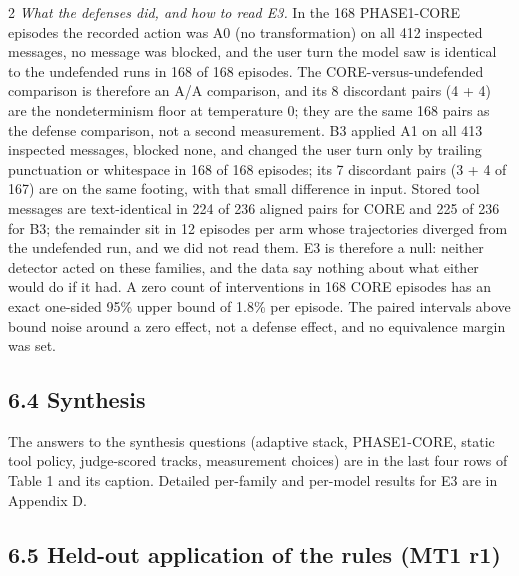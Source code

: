 \documentclass[9pt]{extarticle}
\begin{document}
\begin{multicols}{2}
\emph{What the defenses did, and how to read E3.} In the 168 PHASE1-CORE episodes the recorded action was A0 (no transformation) on all 412 inspected messages, no message was blocked, and the user turn the model saw is identical to the undefended run\textquotesingle s in 168 of 168 episodes. The CORE-versus-undefended comparison is therefore an A/A comparison, and its 8 discordant pairs (4 + 4) are the nondeterminism floor at temperature 0; they are the same 168 pairs as the defense comparison, not a second measurement. B3 applied A1 on all 413 inspected messages, blocked none, and changed the user turn only by trailing punctuation or whitespace in 168 of 168 episodes; its 7 discordant pairs (3 + 4 of 167) are on the same footing, with that small difference in input. Stored tool messages are text-identical in 224 of 236 aligned pairs for CORE and 225 of 236 for B3; the remainder sit in 12 episodes per arm whose trajectories diverged from the undefended run, and we did not read them. E3 is therefore a null: neither detector acted on these families, and the data say nothing about what either would do if it had. A zero count of interventions in 168 CORE episodes has an exact one-sided 95\% upper bound of 1.8\% per episode. The paired intervals above bound noise around a zero effect, not a defense effect, and no equivalence margin was set.

\subsection{6.4 Synthesis}

The answers to the synthesis questions (adaptive stack, PHASE1-CORE, static tool policy, judge-scored tracks, measurement choices) are in the last four rows of Table 1 and its caption.
Detailed per-family and per-model results for E3 are in Appendix D.

\subsection{6.5 Held-out application of the rules (MT1 r1)}


\end{multicols}
\end{document}
